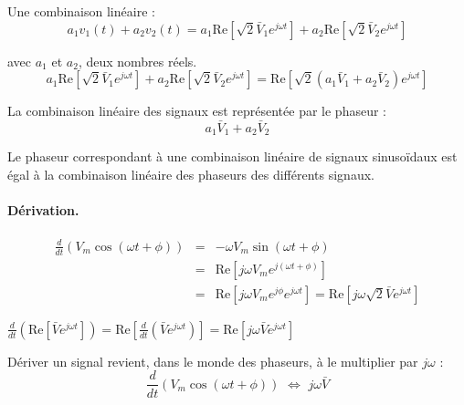 Une combinaison linéaire :
\[a_1v_1(t)+a_2v_2(t)=
a_1\text{Re}[\sqrt{2}\bar{V}_1e^{j\omega t}] +
a_2\text{Re}[\sqrt{2}\bar{V}_2e^{j\omega t}]\]

avec $a_1$ et $a_2$, deux nombres réels.
\[a_1\text{Re}[\sqrt{2}\bar{V}_1e^{j\omega t}] +
a_2\text{Re}[\sqrt{2}\bar{V}_2e^{j\omega t}] =
\text{Re}[\sqrt{2}(a_1\bar{V}_1+a_2\bar{V}_2)e^{j\omega t}]\]

La combinaison linéaire des signaux est représentée par le phaseur :
\[a_1\bar{V}_1+a_2\bar{V}_2\]

\begin{table}
	\caption{Linéarité.}
	\begin{boxedminipage}{\linewidth}
		Le phaseur correspondant à une combinaison linéaire de signaux sinusoïdaux est égal à la combinaison linéaire des phaseurs des différents signaux.
	\end{boxedminipage}
\end{table}

\paragraph{Dérivation.} 
\begin{eqnarray*}
	\frac{d}{dt}\left(V_m\cos(\omega t+\phi)\right)& = &
	-\omega V_m\sin(\omega t+\phi) \\
	& = &\text{Re}[j\omega V_me^{j(\omega t + \phi)}]\\
	& = &\text{Re}[j\omega V_me^{j\phi}e^{j\omega t}]= \text{Re}[j\omega \sqrt{2}\bar{V}e^{j\omega t}]
\end{eqnarray*}
\begin{center}
		$\frac{d}{dt}\left(\text{Re}[\bar{V}e^{j\omega t}]\right)= 
		\text{Re}[\frac{d}{dt}\left( \bar{V}e^{j\omega t}\right)]=
		\text{Re}[j\omega \bar{V}e^{j\omega t}]$
\end{center}
\begin{table}[h]
	\caption{Dérivation.}
	\begin{boxedminipage}{\linewidth}
		Dériver un signal revient, dans le monde des phaseurs, à le multiplier par $j\omega$ :
		\[\frac{d}{dt}\left(V_m\cos(\omega t+\phi)\right)\,\,\Leftrightarrow\,\,
		j\omega \bar{V}\]		
	\end{boxedminipage}
\end{table}

